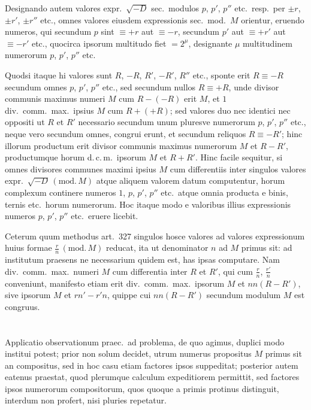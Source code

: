 \documentclass[12pt,a4paper]{article}
\theoremstyle{plain}
\theoremstyle{definition}
\theoremstyle{remark}
\begin{document}
Designando autem valores expr.~$\surd{-D}$ sec.\ modulos $p$, $p'$, $p''$ etc.\ resp.\ per $\pm r$, $\pm r'$, $\pm r''$ etc., omnes valores eiusdem expressionis sec.\ mod.\ $M$ orientur, eruendo numeros, qui secundum $p$ sint $\equiv +r$ aut $\equiv -r$, secundum $p'$ aut $\equiv +r'$ aut $\equiv -r'$ etc., quocirca ipsorum multitudo fiet $=2^\mu$, designante $\mu$ multitudinem numerorum $p$, $p'$, $p''$ etc.

Quodsi itaque hi valores sunt $R$, $-R$, $R'$, $-R'$, $R''$ etc., sponte erit $R\equiv -R$ secundum omnes $p$, $p'$, $p''$ etc., sed secundum nullos $R\equiv +R$, unde divisor communis maximus numeri $M$ cum $R-(-R)$ erit $M$, et $1$ div.\ comm.\ max.\ ipsius $M$ cum $R+(+R)$; sed valores duo nec identici nec oppositi ut $R$ et $R'$ necessario secundum unum pluresve numerorum $p$, $p'$, $p''$ etc., neque vero secundum omnes, congrui erunt, et secundum reliquos $R\equiv -R'$; hinc illorum productum erit divisor communis maximus numerorum $M$ et $R-R'$, productumque horum d.\,c.\,m.\ ipsorum $M$ et $R+R'$. Hinc facile sequitur, si omnes divisores communes maximi ipsius $M$ cum differentiis inter singulos valores expr.~$\surd{-D}\,(\mathrm{mod.}\,M)$ atque aliquem valorem datum computentur, horum complexum continere numeros $1$, $p$, $p'$, $p''$ etc.\ atque omnia producta e binis, ternis etc.\ horum numerorum. Hoc itaque modo e valoribus illius expressionis numeros $p$, $p'$, $p''$ etc.\ eruere licebit.

Ceterum quum methodus art.\ 327 singulos hosce valores ad valores expressionum huius formae $\frac{r}{n}\,(\mathrm{mod.}\,M)$ reducat, ita ut denominator $n$ ad $M$ primus sit: ad institutum praesens ne necessarium quidem est, has ipsas computare. Nam div.\ comm.\ max.\ numeri $M$ cum differentia inter $R$ et $R'$, qui cum $\frac{r}{n}$, $\frac{r'}{n}$ conveniunt, manifesto etiam erit div.\ comm.\ max.\ ipsorum $M$ et $nn(R-R')$, sive ipsorum $M$ et $rn'-r'n$, quippe cui $nn(R-R')$ secundum modulum $M$ est congruus.

\section{}

Applicatio observationum praec.\ ad problema, de quo agimus, duplici modo institui potest; prior non solum decidet, utrum numerus propositus $M$ primus sit an compositus, sed in hoc casu etiam factores ipsos suppeditat; posterior autem eatenus praestat, quod plerumque calculum expeditiorem permittit, sed factores ipsos numerorum compositorum, quos quoque a primis protinus distinguit, interdum non profert, nisi pluries repetatur.
\end{document}
